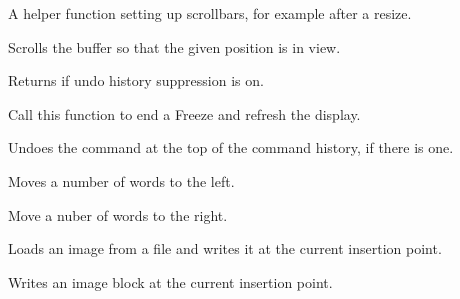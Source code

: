 \label{wxrichtextctrlsetupscrollbars}


A helper function setting up scrollbars, for example after a resize.

\label{wxrichtextctrlshowposition}


Scrolls the buffer so that the given position is in view.

\label{wxrichtextctrlsuppressingundo}


Returns \true if undo history suppression is on.

\label{wxrichtextctrlthaw}


Call this function to end a Freeze and refresh the display.

\label{wxrichtextctrlundo}


Undoes the command at the top of the command history, if there is one.

\label{wxrichtextctrlwordleft}


Moves a number of words to the left.

\label{wxrichtextctrlwordright}


Move a nuber of words to the right.

\label{wxrichtextctrlwriteimage}


Loads an image from a file and writes it at the current insertion point.


Writes an image block at the current insertion point.

